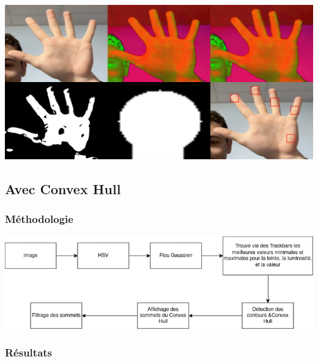 \documentclass[11pt]{article}
\begin{document}
\begin{center}
    \includegraphics[width=\textwidth]{images/detect_fingers_mask_3.png}
    \label{fig:detect_fingers_mask_3}
\end{center}

\newpage


\subsection{Avec Convex Hull}
\subsubsection{Méthodologie}
\begin{center}
    \includegraphics[width=\textwidth]{images/pipeline_detect_fingers_avec_convex_hull.png}
    \label{fig:pipeline_detect_fingers_avec_convex_hull}
\end{center}

\subsubsection{Résultats}
\end{document}
